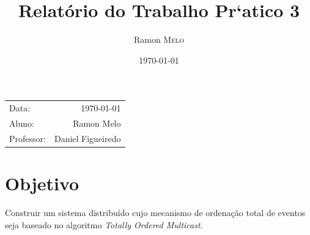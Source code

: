 \documentclass[a4paper,12pt]{article}
\title{Relatório do Trabalho Pr`atico 3} %
\author{Ramon \textsc{Melo}} %
\date{\today} %
\begin{document}

        \begin{center}
            \begin{tabular}{l r}
                Data: & \today \\ %
                Aluno: & Ramon Melo \\ %
                Professor: & Daniel Figueiredo %
            \end{tabular}
        \end{center}


        
        \section{Objetivo}
        
            Construir um sistema distribuído cujo mecanismo de ordenação total de eventos seja baseado no algoritmo \em{Totally Ordered Multicast}.
            
            
\end{document}
